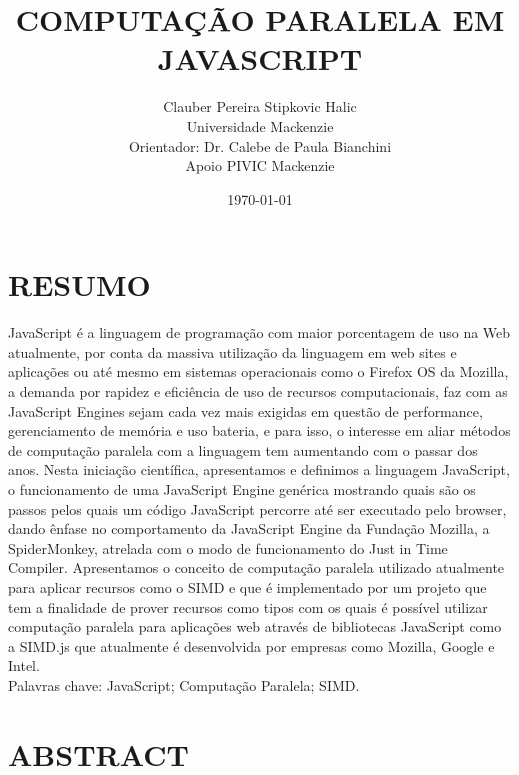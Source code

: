 \documentclass[12pt,a4paper]{article}
\begin{document}
\author{Clauber Pereira Stipkovic Halic\\
  Universidade Mackenzie\\
  Orientador: Dr. Calebe de Paula Bianchini\\
  Apoio PIVIC Mackenzie}
\date{\today}
\title{COMPUTAÇÃO PARALELA EM JAVASCRIPT}
\maketitle

\section{RESUMO}
\label{sec:section1}

JavaScript é a linguagem de programação com maior porcentagem de uso na Web atualmente, por conta da massiva utilização da linguagem em web sites e aplicações ou até mesmo em sistemas operacionais como o Firefox OS da Mozilla, a demanda por rapidez e eficiência de uso de recursos computacionais, faz com as JavaScript Engines sejam cada vez mais exigidas em questão de performance, gerenciamento de memória e uso bateria, e para isso, o interesse em aliar métodos de computação paralela com a linguagem tem aumentando com o passar dos anos. Nesta iniciação científica, apresentamos e definimos a linguagem JavaScript, o funcionamento de uma JavaScript Engine genérica mostrando quais são os passos pelos quais um código JavaScript percorre até ser executado pelo browser, dando ênfase no comportamento da JavaScript Engine da Fundação Mozilla, a SpiderMonkey, atrelada com o modo de funcionamento do Just in Time Compiler. Apresentamos o conceito de computação paralela utilizado atualmente para aplicar recursos como o SIMD e que é implementado por um projeto que tem a finalidade de prover recursos como tipos com os quais é possível utilizar computação paralela para aplicações web através de bibliotecas JavaScript como a SIMD.js que atualmente é desenvolvida por empresas como Mozilla, Google e Intel. \\
Palavras chave: JavaScript; Computação Paralela; SIMD.


\section{ABSTRACT}
\label{sec:section2}
\end{document}
